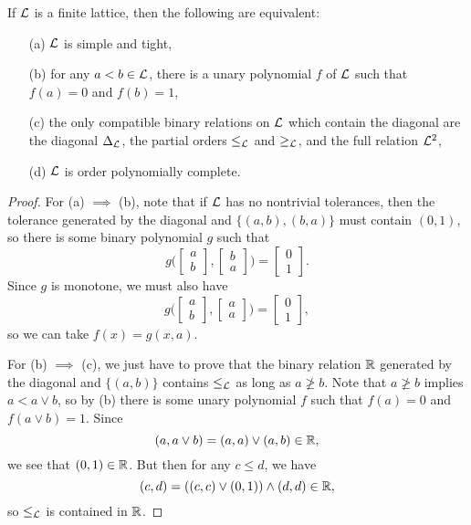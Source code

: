 \begin{appendices}
\begin{prop} If $\mathcal{L}$ is a finite lattice, then the following are equivalent:
\begin{itemize}
\item[(a)] $\mathcal{L}$ is simple and tight,
\item[(b)] for any $a < b \in \mathcal{L}$, there is a unary polynomial $f$ of $\mathcal{L}$ such that $f(a) = 0$ and $f(b) = 1$,
\item[(c)] the only compatible binary relations on $\mathcal{L}$ which contain the diagonal are the diagonal $\Delta_{\mathcal{L}}$, the partial orders $\le_{\mathcal{L}}$ and $\ge_{\mathcal{L}}$, and the full relation $\mathcal{L}^2$,
\item[(d)] $\mathcal{L}$ is order polynomially complete.
\end{itemize}
\end{prop}
\begin{proof} For (a) $\implies$ (b), note that if $\mathcal{L}$ has no nontrivial tolerances, then the tolerance generated by the diagonal and $\{(a,b),(b,a)\}$ must contain $(0,1)$, so there is some binary polynomial $g$ such that
\[
g\Big(\begin{bmatrix} a\\ b \end{bmatrix}, \begin{bmatrix} b\\ a \end{bmatrix}\Big) = \begin{bmatrix} 0\\ 1 \end{bmatrix}.
\]
Since $g$ is monotone, we must also have
\[
g\Big(\begin{bmatrix} a\\ b \end{bmatrix}, \begin{bmatrix} a\\ a \end{bmatrix}\Big) = \begin{bmatrix} 0\\ 1 \end{bmatrix},
\]
so we can take $f(x) = g(x,a)$.

For (b) $\implies$ (c), we just have to prove that the binary relation $\mathbb{R}$ generated by the diagonal and $\{(a,b)\}$ contains $\le_{\mathcal{L}}$ as long as $a \not\ge b$. Note that $a \not\ge b$ implies $a < a \vee b$, so by (b) there is some unary polynomial $f$ such that $f(a) = 0$ and $f(a \vee b) = 1$. Since
\[
(a, a\vee b) = (a,a) \vee (a,b) \in \mathbb{R},
\]
we see that $(0,1) \in \mathbb{R}$. But then for any $c \le d$, we have
\[
(c,d) = ((c,c) \vee (0,1)) \wedge (d,d) \in \mathbb{R},
\]
so $\le_{\mathcal{L}}$ is contained in $\mathbb{R}$.


\end{proof}
\end{appendices}
